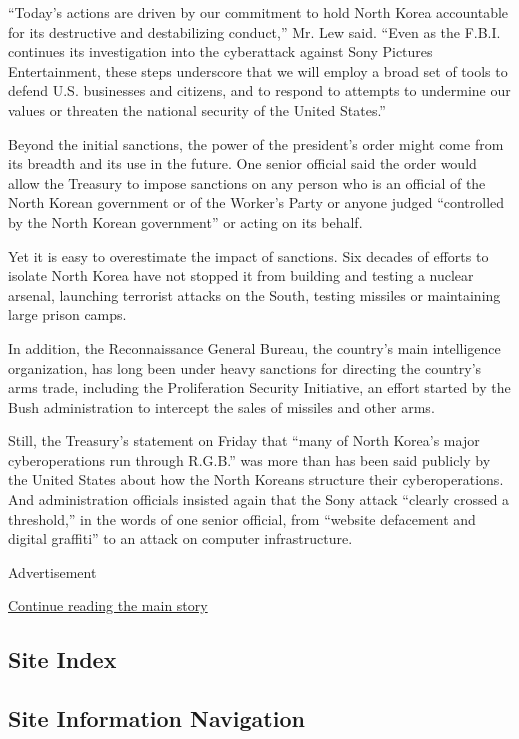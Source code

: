 ``Today's actions are driven by our commitment to hold North Korea
accountable for its destructive and destabilizing conduct,'' Mr. Lew
said. ``Even as the F.B.I. continues its investigation into the
cyberattack against Sony Pictures Entertainment, these steps underscore
that we will employ a broad set of tools to defend U.S. businesses and
citizens, and to respond to attempts to undermine our values or threaten
the national security of the United States.''

Beyond the initial sanctions, the power of the president's order might
come from its breadth and its use in the future. One senior official
said the order would allow the Treasury to impose sanctions on any
person who is an official of the North Korean government or of the
Worker's Party or anyone judged ``controlled by the North Korean
government'' or acting on its behalf.

Yet it is easy to overestimate the impact of sanctions. Six decades of
efforts to isolate North Korea have not stopped it from building and
testing a nuclear arsenal, launching terrorist attacks on the South,
testing missiles or maintaining large prison camps.

In addition, the Reconnaissance General Bureau, the country's main
intelligence organization, has long been under heavy sanctions for
directing the country's arms trade, including the Proliferation Security
Initiative, an effort started by the Bush administration to intercept
the sales of missiles and other arms.

Still, the Treasury's statement on Friday that ``many of North Korea's
major cyberoperations run through R.G.B.'' was more than has been said
publicly by the United States about how the North Koreans structure
their cyberoperations. And administration officials insisted again that
the Sony attack ``clearly crossed a threshold,'' in the words of one
senior official, from ``website defacement and digital graffiti'' to an
attack on computer infrastructure.

Advertisement

\protect\hyperlink{after-bottom}{Continue reading the main story}

\hypertarget{site-index}{%
\subsection{Site Index}\label{site-index}}

\hypertarget{site-information-navigation}{%
\subsection{Site Information
Navigation}\label{site-information-navigation}}

